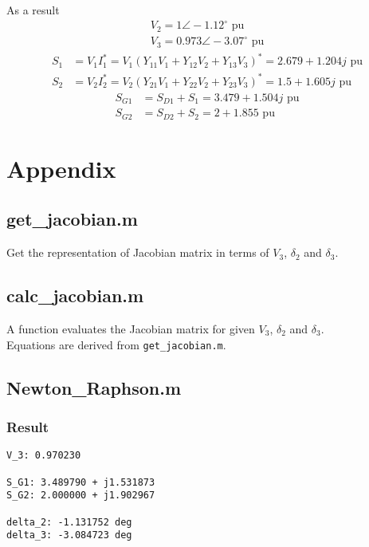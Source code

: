\documentclass{article}
\begin{document}
As a result
\begin{align*}
V_2 = 1 \angle -1.12^{\circ} \text{ pu}\\
V_3 = 0.973 \angle -3.07^{\circ} \text{ pu}
\end{align*}
\begin{align*}
S_1 &= V_1 I_1^* = V_1 (Y_{11} V_1 + Y_{12} V_2 + Y_{13} V_3)^* = 2.679 + 1.204j \text{ pu}\\
S_2 &= V_2 I_2^* = V_2 (Y_{21} V_1 + Y_{22} V_2 + Y_{23} V_3)^* = 1.5 + 1.605j \text{ pu}
\end{align*}
\begin{align*}
S_{G1} &= S_{D1} + S_1 = 3.479 + 1.504j \text{ pu}\\
S_{G2} &= S_{D2} + S_2 = 2 + 1.855 \text{ pu}
\end{align*}


\newpage
\section*{Appendix}

\subsection*{get\_jacobian.m}
Get the representation of Jacobian matrix in terms of $V_3$, $\delta_2$ and $\delta_3$.


\subsection*{calc\_jacobian.m}
A function evaluates the Jacobian matrix for given $V_3$, $\delta_2$ and $\delta_3$.\\
Equations are derived from \texttt{get\_jacobian.m}.


\newpage
\subsection*{Newton\_Raphson.m}


\subsubsection*{Result}
\begin{lstlisting}[language={}]
V_3: 0.970230

S_G1: 3.489790 + j1.531873
S_G2: 2.000000 + j1.902967

delta_2: -1.131752 deg
delta_3: -3.084723 deg
\end{lstlisting}

\end{document}
